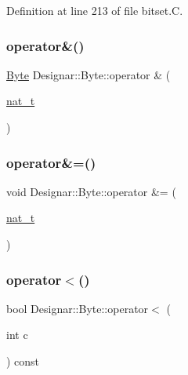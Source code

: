 Definition at line 213 of file bitset.\+C.

\mbox{\label{class_designar_1_1_byte_a7b0c40979b481f74b5e35d0679a71a9b}} 
\subsubsection{\texorpdfstring{operator\&()}{operator\&()}}
{\footnotesize\ttfamily \hyperlink{class_designar_1_1_byte}{Byte} Designar\+::\+Byte\+::operator \& (\begin{DoxyParamCaption}\item[{\hyperlink{namespace_designar_aa72662848b9f4815e7bf31a7cf3e33d1}{nat\+\_\+t}}]{ }\end{DoxyParamCaption})}

\mbox{\label{class_designar_1_1_byte_a3242f8e4098b308f9960a2a172105967}} 
\subsubsection{\texorpdfstring{operator\&=()}{operator\&=()}}
{\footnotesize\ttfamily void Designar\+::\+Byte\+::operator \&= (\begin{DoxyParamCaption}\item[{\hyperlink{namespace_designar_aa72662848b9f4815e7bf31a7cf3e33d1}{nat\+\_\+t}}]{ }\end{DoxyParamCaption})}

\mbox{\label{class_designar_1_1_byte_a94fc22c57bdeed7f674f7db0499becd3}} 
\subsubsection{\texorpdfstring{operator$<$()}{operator<()}}
{\footnotesize\ttfamily bool Designar\+::\+Byte\+::operator$<$ (\begin{DoxyParamCaption}\item[{int}]{c }\end{DoxyParamCaption}) const}



